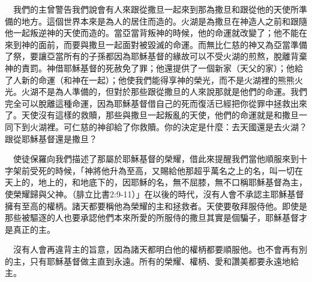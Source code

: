 \documentclass{book}
\begin{document}
　我們的主曾警告我們說會有人來跟從撒旦一起來到那為撒旦和跟從他的天使所準備的地方。這個世界本來是為人的居住而造的。火湖是為撒旦在神造人之前和跟隨他一起叛逆神的天使而造的。當亞當背叛神的時候，他的命運就改變了；他不能在來到神的面前，而要與撒旦一起面對被毀滅的命運。而無比仁慈的神又為亞當準備了祭，要讓亞當所有的子孫都因為耶穌基督的緣故可以不受火湖的煎熬，脫離背棄神的責罰。神借耶穌基督的死赦免了罪；他還提供了一個新家（天父的家）；他給了人新的命運（和神在一起）；他使我們能得享神的榮光，而不是火湖裡的熊熊火光。火湖不是為人準備的，但對於那些跟從撒旦的人來說那就是他們的命運。我們完全可以脫離這種命運，因為耶穌基督借自己的死而復活已經把你從罪中拯救出來了。天使沒有這樣的救贖，那些與撒旦一起叛亂的天使，他們的命運就是和撒旦一同下到火湖裡。可仁慈的神卻給了你救贖。你的決定是什麼：去天國還是去火湖？跟從耶穌基督還是撒旦？

　使徒保羅向我們描述了那屬於耶穌基督的榮耀，借此來提醒我們當他順服來到十字架前受死的時候，「神將他升為至高，又賜給他那超乎萬名之上的名，叫一切在天上的，地上的，和地底下的，因耶穌的名，無不屈膝，無不口稱耶穌基督為主，使榮耀歸與父神。（腓立比書2:9-11）」在以後的時代，沒有人會不承認主耶穌基督擁有至高的權柄。諸天都要稱他為榮耀的主和拯救者。天使要敬拜服侍他。即使是那些被驅逐的人也要承認他們本來所愛的所服侍的撒旦其實是個騙子，耶穌基督才是真正的主。

　沒有人會再違背主的旨意，因為諸天都明白他的權柄都要順服他。也不會再有別的主，只有耶穌基督做主直到永遠。所有的榮耀、權柄、愛和讚美都要永遠地給主。
\end{document}
